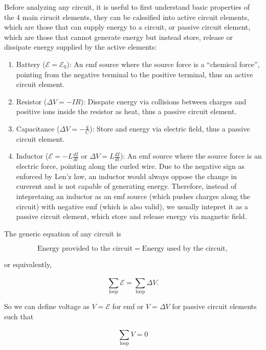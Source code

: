 \documentclass[english,a4paper,12pt]{report}
\begin{document}
Before analyzing any circuit, it is useful to first understand basic properties of the 4 main cirucit elements, they can be calssified into active circuit elements, which are those that can supply energy to a circuit, or passive circuit element, which are those that cannot generate energy but instead store, release or dissipate energy supplied by the active elements:

\begin{enumerate}
    \item Battery (\(\mathcal{E} = \mathcal{E}_{0} \)): An emf source where the source force is a ``chemical force'', pointing from the negative terminal to the positive terminal, thus an active circuit element.
    \item Resistor (\(\Delta V = -IR\)): Disspate energy via collisions between charges and positive ions inside the resistor as heat, thus a passive circuit element.
    \item Capacitance (\(\Delta V = -\frac{q}{C} \)): Store and energy via electric field, thus a passive circuit element.
    \item Inductor (\(\mathcal{E} = -L\frac{dI}{dt} \text { or } \Delta V = L\frac{dI}{dt} \)): An emf source where the source force is an electric force, pointing along the curled wire. Due to the negative sign as enforced by Len'z law, an inductor would always oppose the change in curerent and is not capable of generating energy. Therefore, instead of intepretaing an inductor as an emf source (which pushes charges along the circuit) with negative emf (which is also valid), we usually intepret it as a passive circuit element, which store and release energy via magnetic field.   
\end{enumerate}

The generic equation of any circuit is 

\begin{equation}
    \text{Energy provided to the circuit} = \text{Energy used by the circuit},
\end{equation}

or equivalently, 

\begin{equation} \label{energycircuit} 
    \sum_{\text{loop} }^{} \mathcal{E} = \sum_{\text{loop} }^{} \Delta V. 
\end{equation}

So we can define voltage as \(V = \mathcal{E}\) for emf or \(V = \Delta V\) for passive circuit elements such that 

\begin{equation}
    \sum_{\text{loop} }^{} V = 0 
\end{equation}
\end{document}
